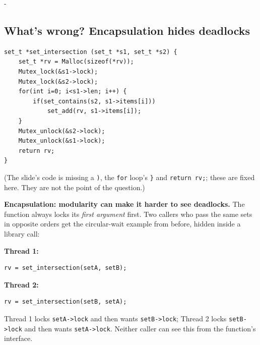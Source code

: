 \documentclass[11pt,a4paper]{article}
\makeatletter
\newcommand{\keepspace}[1]{\par\penalty-100\begingroup
  \setlength{\dimen@}{#1}\dimen@ii\pagegoal\advance\dimen@ii-\pagetotal
  \ifdim\dimen@>\dimen@ii\ifdim\dimen@ii>\z@\vfil\fi\break\fi\endgroup}
\makeatother
\begin{document}
\keepspace{15\baselineskip}
\subsection{What's wrong? Encapsulation hides deadlocks}

\begin{lstlisting}
set_t *set_intersection (set_t *s1, set_t *s2) {
    set_t *rv = Malloc(sizeof(*rv));
    Mutex_lock(&s1->lock);
    Mutex_lock(&s2->lock);
    for(int i=0; i<s1->len; i++) {
        if(set_contains(s2, s1->items[i]))
            set_add(rv, s1->items[i]);
    }
    Mutex_unlock(&s2->lock);
    Mutex_unlock(&s1->lock);
    return rv;
}
\end{lstlisting}
{\small (The slide's code is missing a \texttt{)}, the \texttt{for} loop's
\texttt{\}} and \texttt{return rv;}; these are fixed here. They are not the
point of the question.)}

\medskip
\noindent\textbf{Encapsulation: modularity can make it harder to see
deadlocks.} The function always locks its \emph{first argument} first. Two
callers who pass the same sets in opposite orders get the circular-wait
example from before, hidden inside a library call:

\begin{center}
\begin{minipage}[t]{0.44\textwidth}
\textbf{Thread 1:}
\begin{lstlisting}[numbers=none]
rv = set_intersection(setA, setB);
\end{lstlisting}
\end{minipage}\hfill
\begin{minipage}[t]{0.44\textwidth}
\textbf{Thread 2:}
\begin{lstlisting}[numbers=none]
rv = set_intersection(setB, setA);
\end{lstlisting}
\end{minipage}
\end{center}
Thread 1 locks \texttt{setA->lock} and then wants \texttt{setB->lock}; Thread
2 locks \texttt{setB->lock} and then wants \texttt{setA->lock}. Neither caller
can see this from the function's interface.
\end{document}
